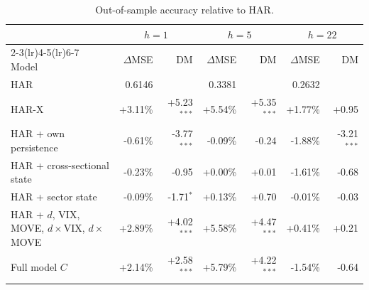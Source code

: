 \begin{table}[H]
\caption{Out-of-sample accuracy relative to HAR.}
\label{tab:ladder}
\footnotesize
\begin{tabularx}{\textwidth}{Xrrrrrr}
\toprule
& \multicolumn{2}{c}{$h=1$} & \multicolumn{2}{c}{$h=5$} & \multicolumn{2}{c}{$h=22$} \\
\cmidrule(lr){2-3}\cmidrule(lr){4-5}\cmidrule(lr){6-7}
Model & $\Delta$MSE & DM & $\Delta$MSE & DM & $\Delta$MSE & DM \\
\midrule
HAR & 0.6146 &  & 0.3381 &  & 0.2632 &  \\
HAR-X & +3.11\% & +5.23$^{***}$ & +5.54\% & +5.35$^{***}$ & +1.77\% & +0.95 \\
HAR + own persistence & -0.61\% & -3.77$^{***}$ & -0.09\% & -0.24 & -1.88\% & -3.21$^{***}$ \\
HAR + cross-sectional state & -0.23\% & -0.95 & +0.00\% & +0.01 & -1.61\% & -0.68 \\
HAR + sector state & -0.09\% & -1.71$^{*}$ & +0.13\% & +0.70 & -0.01\% & -0.03 \\
HAR + $d$, VIX, MOVE, $d\times$VIX, $d\times$MOVE & +2.89\% & +4.02$^{***}$ & +5.58\% & +4.47$^{***}$ & +0.41\% & +0.21 \\
Full model $C$ & +2.14\% & +2.58$^{***}$ & +5.79\% & +4.22$^{***}$ & -1.54\% & -0.64 \\
\bottomrule
\end{tabularx}
\end{table}
